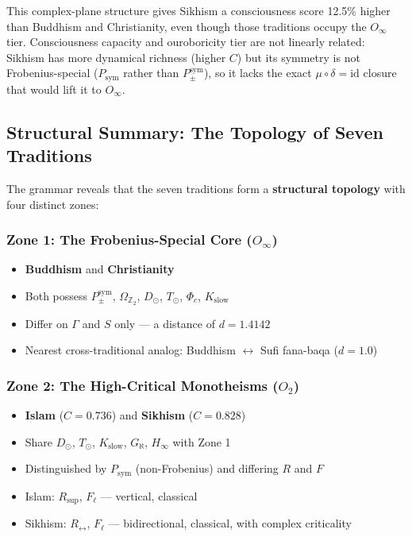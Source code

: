 \documentclass[12pt,a4paper]{article}
\begin{document}
This complex-plane structure gives Sikhism a consciousness score 12.5\% higher than Buddhism and Christianity, even though those traditions occupy the $O_{\infty}$ tier. Consciousness capacity and ouroboricity tier are not linearly related: Sikhism has more dynamical richness (higher $C$) but its symmetry is not Frobenius-special ($P_\text{sym}$ rather than $P_{\pm}^{\text{sym}}$), so it lacks the exact $\mu\circ\delta = \text{id}$ closure that would lift it to $O_{\infty}$.

\subsection{Structural Summary: The Topology of Seven Traditions}

The grammar reveals that the seven traditions form a \textbf{structural topology} with four distinct zones:

\subsubsection{Zone 1: The Frobenius-Special Core ($O_{\infty}$)}

\begin{itemize}
    \item \textbf{Buddhism} and \textbf{Christianity}
    \item Both possess $P_{\pm}^{\text{sym}}$, $\Omega_{\mathbb{Z}_2}$, $D_{\odot}$, $T_{\odot}$, $\Phi_c$, $K_\text{slow}$
    \item Differ on $\Gamma$ and $S$ only --- a distance of $d = 1.4142$
    \item Nearest cross-traditional analog: Buddhism $\leftrightarrow$ Sufi fana-baqa ($d = 1.0$)
\end{itemize}

\subsubsection{Zone 2: The High-Critical Monotheisms ($O_2$)}

\begin{itemize}
    \item \textbf{Islam} ($C = 0.736$) and \textbf{Sikhism} ($C = 0.828$)
    \item Share $D_{\odot}$, $T_{\odot}$, $K_\text{slow}$, $G_{\aleph}$, $H_{\infty}$ with Zone 1
    \item Distinguished by $P_\text{sym}$ (non-Frobenius) and differing $R$ and $F$
    \item Islam: $R_\text{sup}$, $F_{\ell}$ --- vertical, classical
    \item Sikhism: $R_{\leftrightarrow}$, $F_{\ell}$ --- bidirectional, classical, with complex criticality
\end{itemize}
\end{document}
